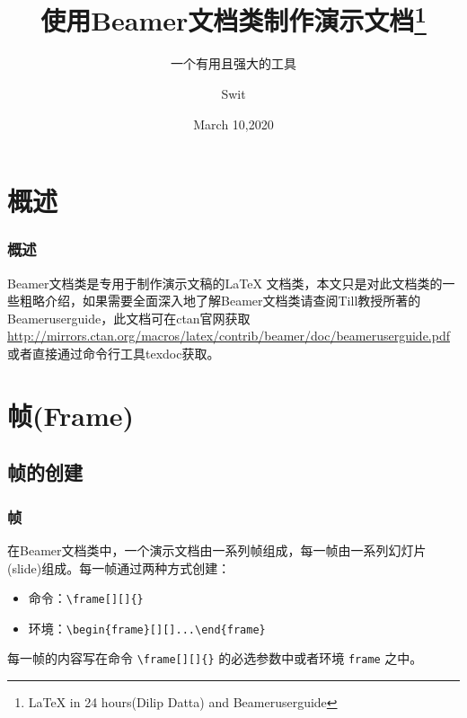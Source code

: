 \documentclass{beamer}
\begin{document}
\begin{frame}
\title{使用Beamer文档类制作演示文档\thanks{\LaTeX{} in 24 hours(Dilip Datta) and Beameruserguide}}
\subtitle{一个有用且强大的工具}
\author{Swit}
\date{March 10,2020}
\maketitle
\end{frame}

\begin{frame}
\begin{multicols}{2}
\tableofcontents
\end{multicols}
\end{frame}

\section{概述}
\begin{frame}
\frametitle{概述}
Beamer文档类是专用于制作演示文稿的\LaTeX{} 文档类，本文只是对此文档类的一些粗略介绍，如果需要全面深入地了解Beamer文档类请查阅Till教授所著的Beameruserguide，此文档可在ctan官网获取 \url{http://mirrors.ctan.org/macros/latex/contrib/beamer/doc/beameruserguide.pdf} 或者直接通过命令行工具texdoc获取。
\end{frame}

\section{帧(Frame)}
\subsection{帧的创建}
\begin{frame}[containsverbatim]
\frametitle{帧}
在Beamer文档类中，一个演示文档由一系列帧组成，每一帧由一系列幻灯片(slide)组成。每一帧通过两种方式创建：
\begin{itemize}
\item 命令：\verb|\frame[][]{}|
\item 环境：\verb|\begin{frame}[][]...\end{frame}|
\end{itemize}
每一帧的内容写在命令 \verb|\frame[][]{}| 的必选参数中或者环境 \verb|frame| 之中。
\end{frame}
\end{document}
